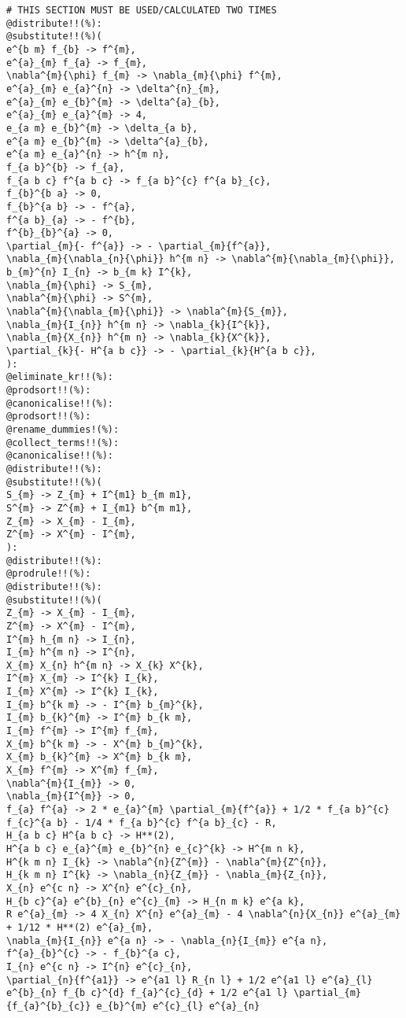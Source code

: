 \documentclass[11pt]{article}
\begin{document}
{\color[named]{Blue}\begin{verbatim}
# THIS SECTION MUST BE USED/CALCULATED TWO TIMES
@distribute!!(%):
@substitute!!(%)(
e^{b m} f_{b} -> f^{m},
e^{a}_{m} f_{a} -> f_{m},
\nabla^{m}{\phi} f_{m} -> \nabla_{m}{\phi} f^{m},
e^{a}_{m} e_{a}^{n} -> \delta^{n}_{m},
e^{a}_{m} e_{b}^{m} -> \delta^{a}_{b},
e^{a}_{m} e_{a}^{m} -> 4,
e_{a m} e_{b}^{m} -> \delta_{a b},
e^{a m} e_{b}^{m} -> \delta^{a}_{b},
e^{a m} e_{a}^{n} -> h^{m n},
f_{a b}^{b} -> f_{a},
f_{a b c} f^{a b c} -> f_{a b}^{c} f^{a b}_{c},
f_{b}^{b a} -> 0,
f_{b}^{a b} -> - f^{a},
f^{a b}_{a} -> - f^{b},
f^{b}_{b}^{a} -> 0,
\partial_{m}{- f^{a}} -> - \partial_{m}{f^{a}},
\nabla_{m}{\nabla_{n}{\phi}} h^{m n} -> \nabla^{m}{\nabla_{m}{\phi}},
b_{m}^{n} I_{n} -> b_{m k} I^{k},
\nabla_{m}{\phi} -> S_{m},
\nabla^{m}{\phi} -> S^{m},
\nabla^{m}{\nabla_{m}{\phi}} -> \nabla^{m}{S_{m}},
\nabla_{m}{I_{n}} h^{m n} -> \nabla_{k}{I^{k}},
\nabla_{m}{X_{n}} h^{m n} -> \nabla_{k}{X^{k}},
\partial_{k}{- H^{a b c}} -> - \partial_{k}{H^{a b c}},
):
@eliminate_kr!!(%):
@prodsort!!(%):
@canonicalise!!(%):
@prodsort!!(%):
@rename_dummies!(%):
@collect_terms!!(%):
@canonicalise!!(%):
@distribute!!(%):
@substitute!!(%)(
S_{m} -> Z_{m} + I^{m1} b_{m m1},
S^{m} -> Z^{m} + I_{m1} b^{m m1},
Z_{m} -> X_{m} - I_{m},
Z^{m} -> X^{m} - I^{m},
):
@distribute!!(%):
@prodrule!!(%):
@distribute!!(%):
@substitute!!(%)(
Z_{m} -> X_{m} - I_{m},
Z^{m} -> X^{m} - I^{m},
I^{m} h_{m n} -> I_{n},
I_{m} h^{m n} -> I^{n},
X_{m} X_{n} h^{m n} -> X_{k} X^{k},
I^{m} X_{m} -> I^{k} I_{k},
I_{m} X^{m} -> I^{k} I_{k},
I_{m} b^{k m} -> - I^{m} b_{m}^{k},
I_{m} b_{k}^{m} -> I^{m} b_{k m},
I_{m} f^{m} -> I^{m} f_{m},
X_{m} b^{k m} -> - X^{m} b_{m}^{k},
X_{m} b_{k}^{m} -> X^{m} b_{k m},
X_{m} f^{m} -> X^{m} f_{m},
\nabla^{m}{I_{m}} -> 0,
\nabla_{m}{I^{m}} -> 0,
f_{a} f^{a} -> 2 * e_{a}^{m} \partial_{m}{f^{a}} + 1/2 * f_{a b}^{c} f_{c}^{a b} - 1/4 * f_{a b}^{c} f^{a b}_{c} - R,
H_{a b c} H^{a b c} -> H**(2),
H^{a b c} e_{a}^{m} e_{b}^{n} e_{c}^{k} -> H^{m n k},
H^{k m n} I_{k} -> \nabla^{n}{Z^{m}} - \nabla^{m}{Z^{n}},
H_{k m n} I^{k} -> \nabla_{n}{Z_{m}} - \nabla_{m}{Z_{n}},
X_{n} e^{c n} -> X^{n} e^{c}_{n},
H_{b c}^{a} e^{b}_{n} e^{c}_{m} -> H_{n m k} e^{a k},
R e^{a}_{m} -> 4 X_{n} X^{n} e^{a}_{m} - 4 \nabla^{n}{X_{n}} e^{a}_{m} + 1/12 * H**(2) e^{a}_{m},
\nabla_{m}{I_{n}} e^{a n} -> - \nabla_{n}{I_{m}} e^{a n},
f^{a}_{b}^{c} -> - f_{b}^{a c},
I_{n} e^{c n} -> I^{n} e^{c}_{n},
\partial_{n}{f^{a1}} -> e^{a1 l} R_{n l} + 1/2 e^{a1 l} e^{a}_{l} e^{b}_{n} f_{b c}^{d} f_{a}^{c}_{d} + 1/2 e^{a1 l} \partial_{m}{f_{a}^{b}_{c}} e_{b}^{m} e^{c}_{l} e^{a}_{n} 

\end{verbatim}}
\end{document}
